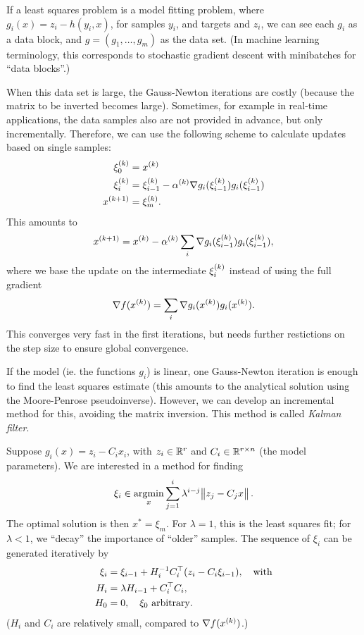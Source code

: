 \documentclass{article}
\begin{document}

If a least squares problem is a model fitting problem, where \(g_i(x) = z_i - h(y_i, x)\), for
samples \(y_i\), and targets and \(z_i\), we can see each \(g_i\) as a data block, and
\(g = (g_1, \ldots, g_m)\) as the data set.  (In machine learning terminology, this corresponds to
stochastic gradient descent with minibatches for ``data blocks''.)

When this data set is large, the Gauss-Newton iterations are costly (because the matrix to be
inverted becomes large).  Sometimes, for example in real-time applications, the data samples also
are not provided in advance, but only incrementally.  Therefore, we can use the following scheme to
calculate updates based on single samples:
\begin{align*}
  \kth{\xi}_0 &= \kth{x} \\
  \kth{\xi}_i &= \kth{\xi}_{i-1} - \kth{\alpha} \nabla g_i(\kth{\xi}_{i-1}) g_i(\kth{\xi}_{i-1}) \\
  \kth[k+1]{x} &= \kth{\xi}_m.
\end{align*}
This amounts to
\begin{equation*}
  \kth[k+1]{x} = \kth{x} - \kth{\alpha} \sum_i \nabla g_i(\kth{\xi}_{i-1}) g_i(\kth{\xi}_{i-1}),
\end{equation*}
where we base the update on the intermediate \(\kth{\xi}_i\) instead of using the full gradient
\begin{equation*}
  \nabla f(\kth{x}) = \sum_i \nabla g_i(\kth{x}) g_i(\kth{x}).
\end{equation*}
This converges very fast in the first iterations, but needs further restictions on the step size to
ensure global convergence.



If the model (ie. the functions \(g_i\)) is linear, one Gauss-Newton iteration is enough to find the
least squares estimate (this amounts to the analytical solution using the Moore-Penrose
pseudoinverse).  However, we can develop an incremental method for this, avoiding the matrix
inversion.  This method is called \emph{Kalman filter}.

Suppose \(g_i(x) = z_i - C_i x_i\), with \(z_i \in \RR^r\) and \(C_i \in \RR^{r \times n}\) (the
model parameters).  We are interested in a method for finding
\begin{equation*}
  \xi_i \in \argmin_x \sum_{j=1}^{i} \lambda^{i-j} \enVert[1]{z_j - C_j x}.
\end{equation*}
The optimal solution is then \(x^* = \xi_m\).  For \(\lambda = 1\), this is the least squares fit;
for \(\lambda < 1\), we ``decay'' the importance of ``older'' samples.  The sequence of \(\xi_i\)
can be generated iteratively by
\begin{align*}
  \xi_i &= \xi_{i-1} + H_i^{-1}\T{C_i}(z_i - C_i \xi_{i-1}), \quad\text{with} \\
  H_i &= \lambda H_{i-1} + \T{C_i}C_i, \\
  H_0 &= 0,\quad \xi_0 \text{ arbitrary}.
\end{align*}
(\(H_i\) and \(C_i\) are relatively small, compared to \(\nabla f(\kth{x})\).)
\end{document}
